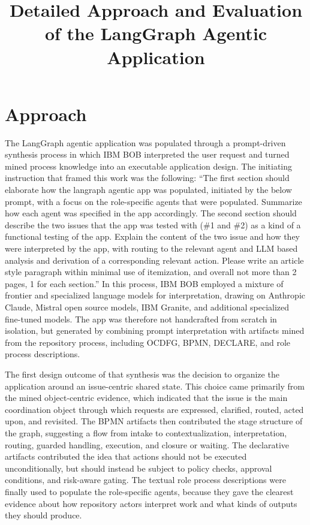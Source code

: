 \documentclass[11pt,a4paper]{article}
\title{Detailed Approach and Evaluation of the LangGraph Agentic Application}
\author{}
\date{}
\begin{document}
\maketitle

\section{Approach}

The LangGraph agentic application was populated through a prompt-driven synthesis process in which IBM BOB interpreted the user request and turned mined process knowledge into an executable application design. The initiating instruction that framed this work was the following: ``The first section should elaborate how the langraph agentic app was populated, initiated by the below prompt, with a focus on the role-specific agents that were populated. Summarize how each agent was specified in the app accordingly. The second section should describe the two issues that the app was tested with (\#1 and \#2) as a kind of a functional testing of the app. Explain the content of the two issue and how they were interpreted by the app, with routing to the relevant agent and LLM based analysis and derivation of a corresponding relevant action. Please write an article style paragraph within minimal use of itemization, and overall not more than 2 pages, 1 for each section.'' In this process, IBM BOB employed a mixture of frontier and specialized language models for interpretation, drawing on Anthropic Claude, Mistral open source models, IBM Granite, and additional specialized fine-tuned models. The app was therefore not handcrafted from scratch in isolation, but generated by combining prompt interpretation with artifacts mined from the repository process, including OCDFG, BPMN, DECLARE, and role process descriptions.

The first design outcome of that synthesis was the decision to organize the application around an issue-centric shared state. This choice came primarily from the mined object-centric evidence, which indicated that the issue is the main coordination object through which requests are expressed, clarified, routed, acted upon, and revisited. The BPMN artifacts then contributed the stage structure of the graph, suggesting a flow from intake to contextualization, interpretation, routing, guarded handling, execution, and closure or waiting. The declarative artifacts contributed the idea that actions should not be executed unconditionally, but should instead be subject to policy checks, approval conditions, and risk-aware gating. The textual role process descriptions were finally used to populate the role-specific agents, because they gave the clearest evidence about how repository actors interpret work and what kinds of outputs they should produce.
\end{document}
